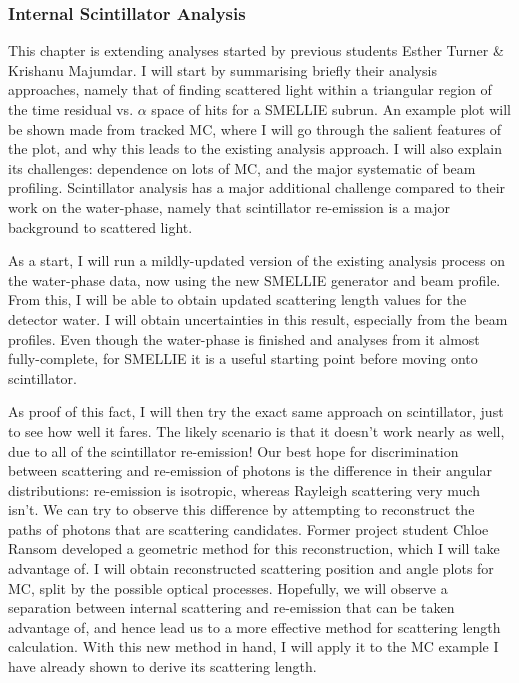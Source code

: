 \subsubsection{Internal Scintillator Analysis}
This chapter is extending analyses started by previous students Esther Turner \& Krishanu Majumdar. I will start by summarising briefly their analysis approaches, namely that of finding scattered light within a triangular region of the time residual vs. $\alpha$ space of hits for a SMELLIE subrun. An example plot will be shown made from tracked MC, where I will go through the salient features of the plot, and why this leads to the existing analysis approach. I will also explain its challenges: dependence on lots of MC, and the major systematic of beam profiling. Scintillator analysis has a major additional challenge compared to their work on the water-phase, namely that scintillator re-emission is a major background to scattered light.

As a start, I will run a mildly-updated version of the existing analysis process on the water-phase data, now using the new SMELLIE generator and beam profile. From this, I will be able to obtain updated scattering length values for the detector water. I will obtain uncertainties in this result, especially from the beam profiles. Even though the water-phase is finished and analyses from it almost fully-complete, for SMELLIE it is a useful starting point before moving onto scintillator.

As proof of this fact, I will then try the exact same approach on scintillator, just to see how well it fares. The likely scenario is that it doesn't work nearly as well, due to all of the scintillator re-emission! Our best hope for discrimination between scattering and re-emission of photons is the difference in their angular distributions: re-emission is isotropic, whereas Rayleigh scattering very much isn't. We can try to observe this difference by attempting to reconstruct the paths of photons that are scattering candidates. Former project student Chloe Ransom developed a geometric method for this reconstruction, which I will take advantage of. I will obtain reconstructed scattering position and angle plots for MC, split by the possible optical processes. Hopefully, we will observe a separation between internal scattering and re-emission that can be taken advantage of, and hence lead us to a more effective method for scattering length calculation. With this new method in hand, I will apply it to the MC example I have already shown to derive its scattering length.

